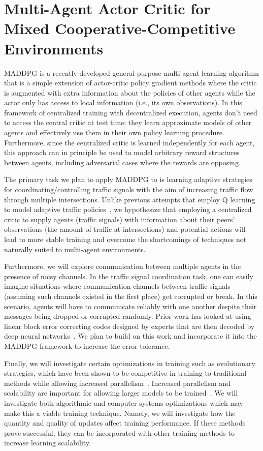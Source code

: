 
\section{Multi-Agent Actor Critic for Mixed Cooperative-Competitive Environments}
\label{sec:direction2}

MADDPG is a recently developed general-purpose multi-agent learning algorithm
that is a simple extension of actor-critic policy gradient methods where the
critic is augmented with extra information about the policies of other agents
while the actor only has access to local information (i.e., its own
observations). In this framework of centralized training with decentralized
execution, agents don’t need to access the central critic at test time; they
learn approximate models of other agents and effectively use them in their own
policy learning procedure. Furthermore, since the centralized critic is
learned independently for each agent, this approach can in principle be used
to model arbitrary reward structures between agents, including adversarial
cases where the rewards are opposing.

The primary task we plan to apply MADDPG to is learning adaptive strategies
for coordinating/controlling traffic signals with the aim of increasing
traffic flow through multiple intersections. Unlike previous attempts that
employ Q learning to model adaptive traffic policies~\cite{araghi2015traffic},
we hypothesize that employing a centralized critic to supply agents (traffic
signals) with information about their peers’ observations (the amount of
traffic at intersections) and potential actions will lead to more stable
training and overcome the shortcomings of techniques not naturally suited to
multi-agent environments.

Furthermore, we will explore communication between multiple agents in the
presence of noisy channels. In the traffic signal coordination task, one can
easily imagine situations where communication channels between traffic signals
(assuming such channels existed in the first place) get corrupted or break. In
this scenario, agents will have to communicate reliably with one another
despite their messages being dropped or corrupted randomly. Prior work has
looked at using linear block error correcting codes designed by experts that
are then decoded by deep neural networks~\cite{nachmani2016learning,
nachmani2017rnn}. We plan to build on this work and incorporate it into the
MADDPG framework to increase the error tolerance.

Finally, we will investigate certain optimizations in training such as
evolutionary strategies, which have been shown to be competitive in training
to traditional methods while allowing increased
parallelism~\cite{salimans2017evolution}.
Increased parallelism and scalability are important for allowing larger models to be trained~\cite{nair2015massively}.
We will investigate both algorithmic and computer systems optimizations which may make this a viable training technique.
Namely, we will investigate how the quantity and quality of updates affect training performance.
If these methods prove successful, they can be incorporated with other training methods to increase learning scalability.

